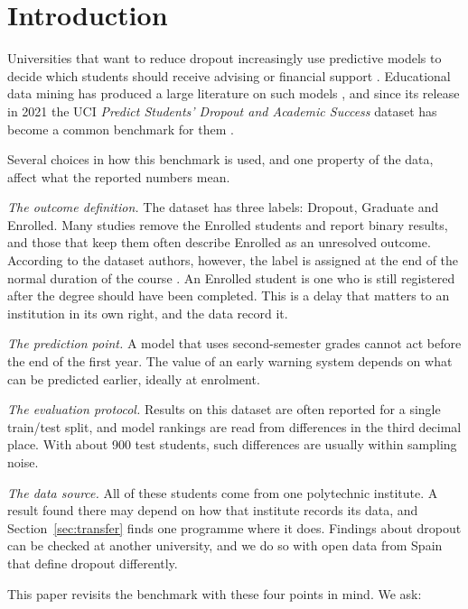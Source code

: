 \documentclass[11pt,a4paper]{article}
\begin{document}
\section{Introduction}
\label{sec:intro}

Universities that want to reduce dropout increasingly use predictive models to decide which students should receive advising or financial support \citep{arnold2012,jayaprakash2014}. Educational data mining has produced a large literature on such models \citep{romero2010,romero2020,namoun2021,mduma2019}, and since its release in 2021 the UCI \emph{Predict Students' Dropout and Academic Success} dataset \citep{realinho2021uci,realinho2022} has become a common benchmark for them \citep{martins2021,villar2024,gu2026,vo2026}.

Several choices in how this benchmark is used, and one property of the data, affect what the reported numbers mean.

\emph{The outcome definition.} The dataset has three labels: Dropout, Graduate and Enrolled. Many studies remove the Enrolled students and report binary results, and those that keep them often describe Enrolled as an unresolved outcome. According to the dataset authors, however, the label is assigned at the end of the normal duration of the course \citep{realinho2022}. An Enrolled student is one who is still registered after the degree should have been completed. This is a delay that matters to an institution in its own right, and the data record it.

\emph{The prediction point.} A model that uses second-semester grades cannot act before the end of the first year. The value of an early warning system depends on what can be predicted earlier, ideally at enrolment.

\emph{The evaluation protocol.} Results on this dataset are often reported for a single train/test split, and model rankings are read from differences in the third decimal place. With about 900 test students, such differences are usually within sampling noise.

\emph{The data source.} All of these students come from one polytechnic institute. A result found there may depend on how that institute records its data, and Section~\ref{sec:transfer} finds one programme where it does. Findings about dropout can be checked at another university, and we do so with open data from Spain that define dropout differently.

This paper revisits the benchmark with these four points in mind. We ask:
\end{document}
